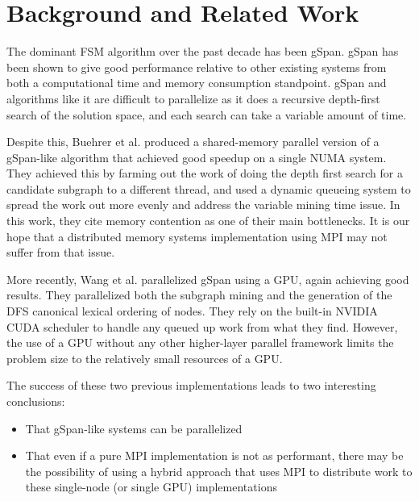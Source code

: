 \section{Background and Related Work}
\label{sec:background}

The dominant FSM algorithm over the past decade has been gSpan\cite{gspan}. 
gSpan has been shown to give good performance relative to other existing
systems from both a computational time and memory consumption standpoint.
gSpan and algorithms like it are difficult to parallelize as it does a 
recursive depth-first search of the solution space, and each search
can take a variable amount of time.   

Despite this, Buehrer et al. produced a shared-memory
parallel version of a gSpan-like algorithm that achieved good speedup on a 
single NUMA system\cite{buehrer2005parallel}.  They achieved this by 
farming out the work of doing the depth first search for a candidate 
subgraph to a different thread, and used a dynamic queueing 
system to spread the work out more evenly and address the variable
mining time issue.  In this work, they cite 
memory contention as one of their main bottlenecks. It is our hope that
a distributed memory systems implementation using MPI may not suffer
from that issue.  

More recently, Wang et al. parallelized gSpan using a 
GPU\cite{gspancuda}, again achieving good results.  They parallelized both
the subgraph mining and the generation of the DFS canonical lexical 
ordering of nodes.  They rely on the built-in NVIDIA CUDA scheduler to handle
any queued up work from what they find. However, the use of a 
GPU without any other higher-layer parallel framework limits the problem
size to the relatively small resources of a GPU. 

The success of these two previous implementations leads to two interesting
conclusions:
\begin{itemize}
	\item{That gSpan-like systems can be parallelized}
	\item{That even if a pure MPI implementation is not as performant, 
		there may be the possibility of using a hybrid approach
		that uses MPI to distribute work to these single-node 
		(or single GPU) implementations}
\end{itemize}

